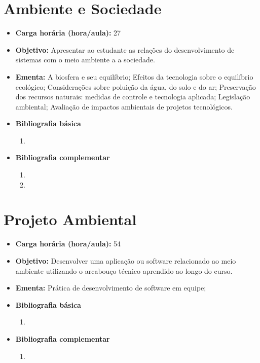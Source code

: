 \documentclass[11pt,fleqn]{book} %
\begin{document}
\section{Ambiente e Sociedade}\label{3_educamb}
\begin{itemize}
	\item \textbf{Carga horária (hora/aula):} 27
	\item \textbf{Objetivo:} Apresentar ao estudante as relações do desenvolvimento de sistemas com o meio ambiente a a sociedade.
	\item \textbf{Ementa:} 
	A biosfera e seu equilíbrio;
	Efeitos da tecnologia sobre o equilíbrio ecológico;
	Considerações sobre poluição da água, do solo e do ar;
	Preservação dos recursos naturais: medidas de controle e tecnologia aplicada;
	Legislação ambiental;
	Avaliação de impactos ambientais de projetos tecnológicos.
	\item \textbf{Bibliografia básica}
	\begin{enumerate}
		\item 
	\end{enumerate}
	\item \textbf{Bibliografia complementar}
	\begin{enumerate}
		\item
		\item 
	\end{enumerate}
\end{itemize}


\newpage
\section{Projeto Ambiental}\label{3_projamb}
\begin{itemize}
	\item \textbf{Carga horária (hora/aula):} 54
	\item \textbf{Objetivo:} Desenvolver uma aplicação ou software relacionado ao meio ambiente utilizando o arcabouço técnico aprendido ao longo do curso.
	\item \textbf{Ementa:} 
	Prática de desenvolvimento de software em equipe;
	\item \textbf{Bibliografia básica}
	\begin{enumerate}
		\item 
	\end{enumerate}
	\item \textbf{Bibliografia complementar}
	\begin{enumerate}
		\item 	
	\end{enumerate}	
\end{itemize}
\end{document}
